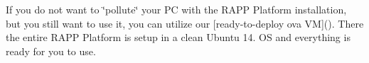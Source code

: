 If you do not want to \char`\"{}pollute\char`\"{} your P\-C with the R\-A\-P\-P Platform installation, but you still want to use it, you can utilize our \mbox{[}ready-\/to-\/deploy ova V\-M\mbox{]}(). There the entire R\-A\-P\-P Platform is setup in a clean Ubuntu 14. O\-S and everything is ready for you to use. 